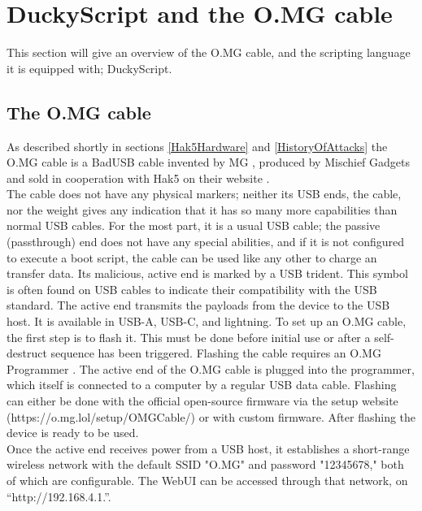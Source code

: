\section{DuckyScript and the O.MG cable}


This section will give an overview of the O.MG cable, and the scripting language it is equipped with; DuckyScript. 

\subsection{The O.MG cable} \label{theOMGCable}

As described shortly in sections \ref{Hak5Hardware} and \ref{HistoryOfAttacks} the O.MG cable is a BadUSB cable invented by MG \cite{MGCable2019a}, produced by Mischief Gadgets \cite{hak5MischiefGadgets} and sold in cooperation with Hak5 on their website \cite{hak5MischiefGadgets}. \\
The cable does not have any physical markers; neither its USB ends, the cable, nor the weight gives any indication that it has so many more capabilities than normal USB cables. For the most part, it is a usual USB cable; the passive (passthrough) end does not have any special abilities, and if it is not configured to execute a boot script, the cable can be used like any other to charge an transfer data. Its malicious, active end is marked by a USB trident. This symbol is often found on USB cables to indicate their compatibility with the USB standard. The active end transmits the payloads from the device to the USB host. It is available in USB-A, USB-C, and lightning. 
To set up an O.MG cable, the first step is to flash it. This must be done before initial use or after a self-destruct sequence has been triggered. Flashing the cable requires an O.MG Programmer \cite{hak5MGCable}. The active end of the O.MG cable is plugged into the programmer, which itself is connected to a computer by a regular USB data cable. Flashing can either be done with the official open-source firmware \cite{DuckyScriptSyntaxGuide} via the setup website (https://o.mg.lol/setup/OMGCable/) or with custom firmware. After flashing the device is ready to be used. \\  
Once the active end receives power from a USB host, it establishes a short-range wireless network with the default SSID "O.MG" and password "12345678," both of which are configurable. The WebUI can be accessed through that network, on ``http://192.168.4.1.''. \\

